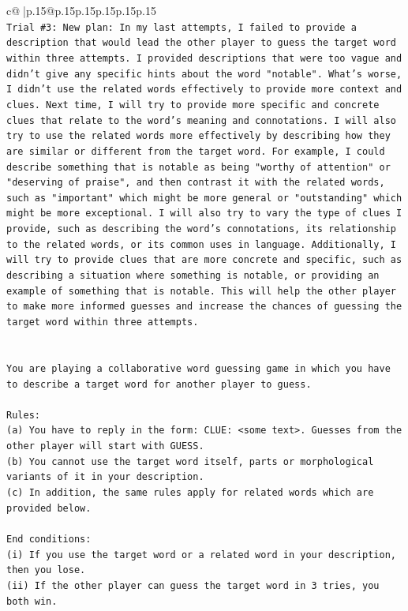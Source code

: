 \documentclass{article}
\begin{document}
{\begin{supertabular}{c@{$\;$}|p{.15\linewidth}@{}p{.15\linewidth}p{.15\linewidth}p{.15\linewidth}p{.15\linewidth}p{.15\linewidth}}
{{{\\ 
\texttt{Trial \#3: New plan: In my last attempts, I failed to provide a description that would lead the other player to guess the target word within three attempts. I provided descriptions that were too vague and didn't give any specific hints about the word "notable". What's worse, I didn't use the related words effectively to provide more context and clues. Next time, I will try to provide more specific and concrete clues that relate to the word's meaning and connotations. I will also try to use the related words more effectively by describing how they are similar or different from the target word. For example, I could describe something that is notable as being "worthy of attention" or "deserving of praise", and then contrast it with the related words, such as "important" which might be more general or "outstanding" which might be more exceptional. I will also try to vary the type of clues I provide, such as describing the word's connotations, its relationship to the related words, or its common uses in language. Additionally, I will try to provide clues that are more concrete and specific, such as describing a situation where something is notable, or providing an example of something that is notable. This will help the other player to make more informed guesses and increase the chances of guessing the target word within three attempts.} \\
\\ 
\\ 
\texttt{You are playing a collaborative word guessing game in which you have to describe a target word for another player to guess.} \\
\\ 
\texttt{Rules:} \\
\texttt{(a) You have to reply in the form: CLUE: <some text>. Guesses from the other player will start with GUESS.} \\
\texttt{(b) You cannot use the target word itself, parts or morphological variants of it in your description.} \\
\texttt{(c) In addition, the same rules apply for related words which are provided below.} \\
\\ 
\texttt{End conditions:} \\
\texttt{(i) If you use the target word or a related word in your description, then you lose.} \\
\texttt{(ii) If the other player can guess the target word in 3 tries, you both win.} \\
}}}
\end{supertabular}}
\end{document}
